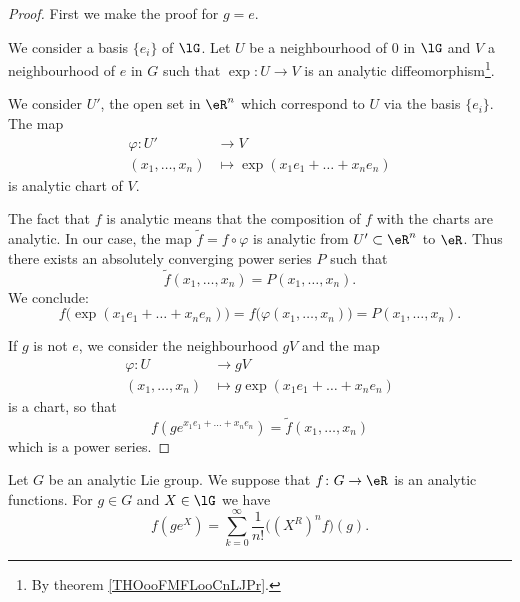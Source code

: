 \begin{proof}
	First we make the proof for \( g=e\).

	We consider a basis \( \{ e_i \}\) of \( \lG\). Let \( U\) be a neighbourhood of \( 0\) in \( \lG\) and \( V\) a neighbourhood of \( e\) in \( G\) such that \( \exp\colon U\to V\) is an analytic diffeomorphism\footnote{By theorem \ref{THOooFMFLooCnLJPr}.}.

	We consider \( U'\), the open set in \( \eR^n\) which correspond to \( U\) via the basis \( \{ e_i \}\). The map
	\begin{equation}
		\begin{aligned}
			\varphi\colon U'  & \to V                              \\
			(x_1,\ldots, x_n) & \mapsto \exp(x_1e_1+\ldots+x_ne_n)
		\end{aligned}
	\end{equation}
	is analytic chart of \( V\).

	The fact that \( f\) is analytic means that the composition of \( f\) with the charts are analytic. In our case, the map \( \tilde f =f\circ\varphi\) is analytic from \( U'\subset \eR^n\) to \( \eR\). Thus there exists an absolutely converging power series \( P\) such that
	\begin{equation}
		\tilde f(x_1,\ldots, x_n)=P(x_1,\ldots, x_n).
	\end{equation}
	We conclude:
	\begin{equation}
		f\big( \exp(x_1e_1+\ldots +x_ne_n) \big)=f\big( \varphi(x_1,\ldots, x_n) \big)=P(x_1,\ldots, x_n).
	\end{equation}

	If \( g\) is not \( e\), we consider the neighbourhood \( gV\) and the map
	\begin{equation}
		\begin{aligned}
			\varphi\colon U   & \to gV                               \\
			(x_1,\ldots, x_n) & \mapsto g\exp(x_1e_1+\ldots +x_ne_n)
		\end{aligned}
	\end{equation}
	is a chart, so that
	\begin{equation}
		f(g e^{x_1e_1+\ldots +x_ne_n})=\tilde f(x_1,\ldots, x_n)
	\end{equation}
	which is a power series.
\end{proof}

\begin{proposition}     \label{PROPooIYWQooZJtKiu}
	Let \( G\) be an analytic Lie group. We suppose that \( f\colon G\to \eR\) is an analytic functions. For \( g\in G\) and \( X\in \lG\) we have
	\begin{equation}
		f(g e^{X})=\sum_{k=0}^{\infty}\frac{1}{ n! }\big( (X^R)^nf \big)(g).
	\end{equation}
\end{proposition}

